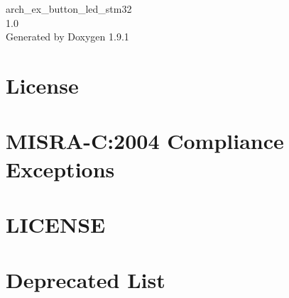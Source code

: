 \let\mypdfximage\pdfximage\def\pdfximage{\immediate\mypdfximage}\documentclass[twoside]{book}
\newcommand{\+}{\discretionary{\mbox{\scriptsize$\hookleftarrow$}}{}{}}
\newcommand{\clearemptydoublepage}{%
  \newpage{\pagestyle{empty}\cleardoublepage}%
}
\begin{document}
\raggedbottom

\hypersetup{pageanchor=false,
             bookmarksnumbered=true,
             pdfencoding=unicode
            }
\begin{titlepage}
\vspace*{7cm}
\begin{center}%
{\Large arch\+\_\+ex\+\_\+button\+\_\+led\+\_\+stm32 \\[1ex]\large 1.\+0 }\\
\vspace*{1cm}
{\large Generated by Doxygen 1.9.1}\\
\end{center}
\end{titlepage}
\clearemptydoublepage
{}
\tableofcontents
\clearemptydoublepage
{}
\hypersetup{pageanchor=true}

\chapter{License}
\label{md__media_rodrigo_che__files__git_hub_arch_ex_button_led_stm32_arch_ex_button_led_stm32__drivers6e160f153bb450f63b57299cd75fdf5a}

\chapter{MISRA-\/C\+:2004 Compliance Exceptions}
\label{_c_m_s_i_s__m_i_s_r_a__exceptions}

\chapter{LICENSE}
\label{md__media_rodrigo_che__files__git_hub_arch_ex_button_led_stm32_arch_ex_button_led_stm32__drivers74a9d0136e8f0379efeae6bdd0392476}

\chapter{Deprecated List}
\label{deprecated}

\end{document}
